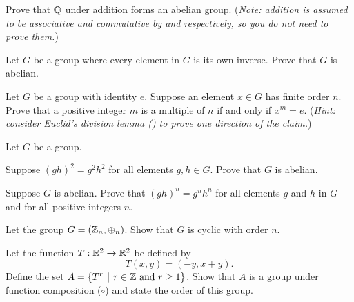 \begin{problem}\label{problem-Q-is-abelian-group-under-addition}
    Prove that $\mathbb{Q}$ under addition forms an abelian group.\newline
    (\textit{Note: addition is assumed to be associative and commutative by  and  respectively, so you do not need to prove them.})
\end{problem}

\begin{problem}
    Let $G$ be a group where every element in $G$ is its own inverse. Prove that $G$ is abelian.
\end{problem}

\begin{problem}\label{problem-element-to-power-of-multiple-of-order-is-identity}
    Let $G$ be a group with identity $e$. Suppose an element $x \in G$ has finite order $n$. Prove that a positive integer $m$ is a multiple of $n$ if and only if $x^m = e$.\newline
    (\textit{Hint: consider Euclid's division lemma () to prove one direction of the claim.})
\end{problem}

\begin{problem}
    Let $G$ be a group.
    \begin{partquestions}{\alph*}
        \item Suppose $(gh)^2 = g^2h^2$ for all elements $g, h \in G$. Prove that $G$ is abelian.
        \item Suppose $G$ is abelian. Prove that $(gh)^n = g^nh^n$ for all elements $g$ and $h$ in $G$ and for all positive integers $n$.
    \end{partquestions}
\end{problem}

\begin{problem}
    Let the group $G = (\mathbb{Z}_n, \oplus_n)$. Show that $G$ is cyclic with order $n$.
\end{problem}

\begin{problem}
    Let the function $T: \mathbb{R}^2 \to \mathbb{R}^2$ be defined by
    \[
        T(x, y) = (-y, x+y).
    \]
    Define the set $A = \{T^r \vert r \in \Z \text{ and } r \geq 1\}$. Show that $A$ is a group under function composition ($\circ$) and state the order of this group.
\end{problem}
